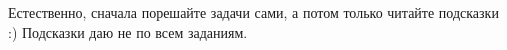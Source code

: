 \cleardoublepage
{}
Естественно, сначала порешайте задачи сами, а потом только читайте подсказки :) Подсказки даю не по всем заданиям.






                                                                                                                            


